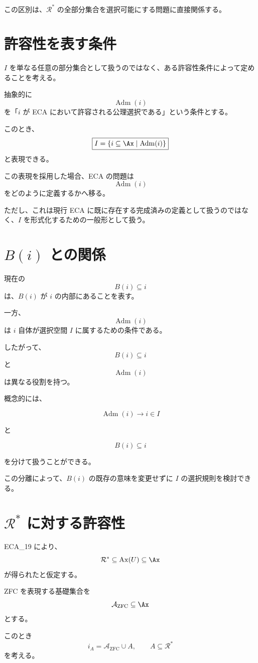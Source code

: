 \documentclass[a4paper,11pt]{ltjsarticle}
\begin{document}
この区別は、$\mathcal{R}^*$ の全部分集合を選択可能にする問題に直接関係する。

\section{許容性を表す条件}

$I$ を単なる任意の部分集合として扱うのではなく、ある許容性条件によって定めることを考える。

抽象的に
\[
\operatorname{Adm}(i)
\]
を「$i$ が ECA において許容される公理選択である」という条件とする。

このとき、
\[
\boxed{
I=\{i\subseteq\Ax\mid\operatorname{Adm}(i)\}
}
\]
と表現できる。

この表現を採用した場合、ECA の問題は
\[
\operatorname{Adm}(i)
\]
をどのように定義するかへ移る。

ただし、これは現行 ECA に既に存在する完成済みの定義として扱うのではなく、$I$ を形式化するための一般形として扱う。

\section{$B(i)$ との関係}

現在の
\[
B(i)\subseteq i
\]
は、$B(i)$ が $i$ の内部にあることを表す。

一方、
\[
\operatorname{Adm}(i)
\]
は $i$ 自体が選択空間 $I$ に属するための条件である。

したがって、
\[
B(i)\subseteq i
\]
と
\[
\operatorname{Adm}(i)
\]
は異なる役割を持つ。

概念的には、

\[
\operatorname{Adm}(i)
\longrightarrow
i\in I
\]

と

\[
B(i)\subseteq i
\]

を分けて扱うことができる。

この分離によって、$B(i)$ の既存の意味を変更せずに $I$ の選択規則を検討できる。

\section{$\mathcal{R}^*$ に対する許容性}

ECA_19 により、
\[
\mathcal{R}^*
\subseteq\operatorname{Ax}(U)
\subseteq\Ax
\]
が得られたと仮定する。

ZFC を表現する基礎集合を
\[
\mathcal{A}_{\mathrm{ZFC}}\subseteq\Ax
\]
とする。

このとき
\[
i_A=\mathcal{A}_{\mathrm{ZFC}}\cup A,
\qquad
A\subseteq\mathcal{R}^*
\]
を考える。
\end{document}
